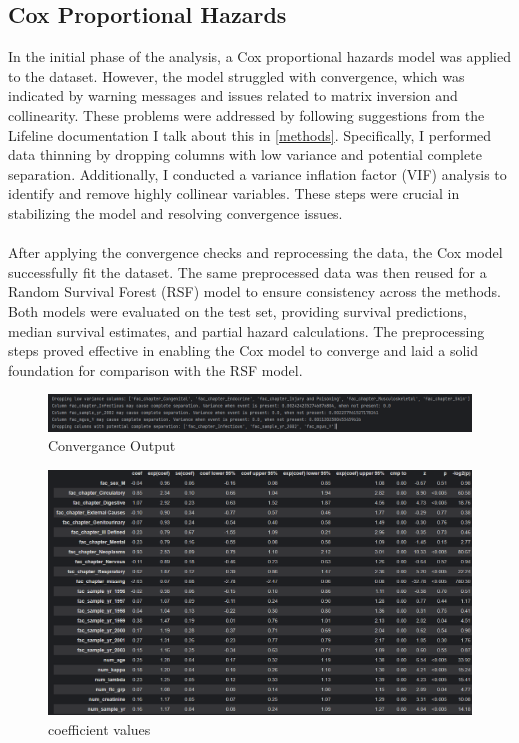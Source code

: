 \subsection{Cox Proportional Hazards}
In the initial phase of the analysis, a Cox proportional hazards model was applied to the dataset. However, the model struggled with convergence, which was indicated by warning messages and issues related to matrix inversion and collinearity. These problems were addressed by following suggestions from the Lifeline documentation I talk about this in \ref{methods}. Specifically, I performed data thinning by dropping columns with low variance and potential complete separation. Additionally, I conducted a variance inflation factor (VIF) analysis to identify and remove highly collinear variables. These steps were crucial in stabilizing the model and resolving convergence issues.
\\\\
\noindent After applying the convergence checks and reprocessing the data, the Cox model successfully fit the dataset. The same preprocessed data was then reused for a Random Survival Forest (RSF) model to ensure consistency across the methods. Both models were evaluated on the test set, providing survival predictions, median survival estimates, and partial hazard calculations. The preprocessing steps proved effective in enabling the Cox model to converge and laid a solid foundation for comparison with the RSF model.

\begin{figure}[h]
    \centering
    \includegraphics[width=\linewidth]{Figures/SURV/convergance_chaek.png}
    \caption{Convergance Output}
    \label{fig:conv_out}
\end{figure}


\begin{figure}[h]
    \centering
    \includegraphics[width=\linewidth]{Figures/SURV/covariates.png}
    \caption{coefficient values}
    \label{fig:your_label}
\end{figure}

